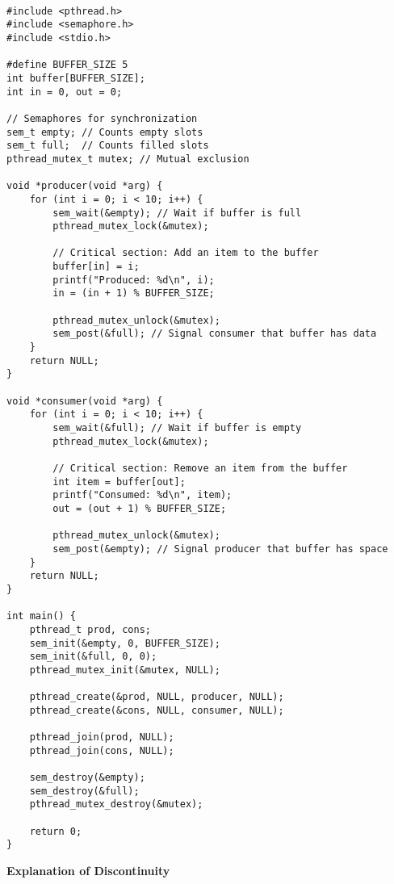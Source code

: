 \documentclass[a4paper]{book}
\begin{document}
\begin{verbatim}

#include <pthread.h>
#include <semaphore.h>
#include <stdio.h>

#define BUFFER_SIZE 5
int buffer[BUFFER_SIZE];
int in = 0, out = 0;

// Semaphores for synchronization
sem_t empty; // Counts empty slots
sem_t full;  // Counts filled slots
pthread_mutex_t mutex; // Mutual exclusion

void *producer(void *arg) {
    for (int i = 0; i < 10; i++) {
        sem_wait(&empty); // Wait if buffer is full
        pthread_mutex_lock(&mutex);

        // Critical section: Add an item to the buffer
        buffer[in] = i;
        printf("Produced: %d\n", i);
        in = (in + 1) % BUFFER_SIZE;

        pthread_mutex_unlock(&mutex);
        sem_post(&full); // Signal consumer that buffer has data
    }
    return NULL;
}

void *consumer(void *arg) {
    for (int i = 0; i < 10; i++) {
        sem_wait(&full); // Wait if buffer is empty
        pthread_mutex_lock(&mutex);

        // Critical section: Remove an item from the buffer
        int item = buffer[out];
        printf("Consumed: %d\n", item);
        out = (out + 1) % BUFFER_SIZE;

        pthread_mutex_unlock(&mutex);
        sem_post(&empty); // Signal producer that buffer has space
    }
    return NULL;
}

int main() {
    pthread_t prod, cons;
    sem_init(&empty, 0, BUFFER_SIZE);
    sem_init(&full, 0, 0);
    pthread_mutex_init(&mutex, NULL);

    pthread_create(&prod, NULL, producer, NULL);
    pthread_create(&cons, NULL, consumer, NULL);

    pthread_join(prod, NULL);
    pthread_join(cons, NULL);

    sem_destroy(&empty);
    sem_destroy(&full);
    pthread_mutex_destroy(&mutex);

    return 0;
}
\end{verbatim}

\textbf{Explanation of Discontinuity}
\end{document}
